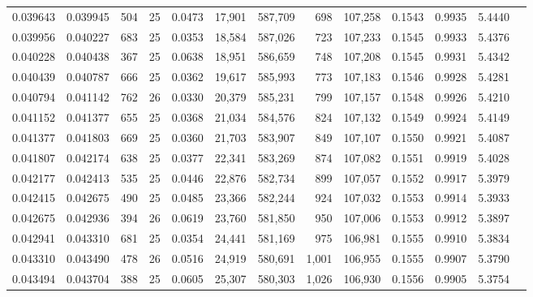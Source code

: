 \begin{tabular}{rrrrrrrrrrrrr}
0.039643 & 0.039945 & 504 &  25 &                                     0.0473 &  17,901 & 587,709 &     698 & 107,258 & 0.1543 & 0.9935 & 5.4440 \\
0.039956 & 0.040227 & 683 &  25 &                                     0.0353 &  18,584 & 587,026 &     723 & 107,233 & 0.1545 & 0.9933 & 5.4376 \\
0.040228 & 0.040438 & 367 &  25 &                                     0.0638 &  18,951 & 586,659 &     748 & 107,208 & 0.1545 & 0.9931 & 5.4342 \\
0.040439 & 0.040787 & 666 &  25 &                                     0.0362 &  19,617 & 585,993 &     773 & 107,183 & 0.1546 & 0.9928 & 5.4281 \\
0.040794 & 0.041142 & 762 &  26 &                                     0.0330 &  20,379 & 585,231 &     799 & 107,157 & 0.1548 & 0.9926 & 5.4210 \\
0.041152 & 0.041377 & 655 &  25 &                                     0.0368 &  21,034 & 584,576 &     824 & 107,132 & 0.1549 & 0.9924 & 5.4149 \\
0.041377 & 0.041803 & 669 &  25 &                                     0.0360 &  21,703 & 583,907 &     849 & 107,107 & 0.1550 & 0.9921 & 5.4087 \\
0.041807 & 0.042174 & 638 &  25 &                                     0.0377 &  22,341 & 583,269 &     874 & 107,082 & 0.1551 & 0.9919 & 5.4028 \\
0.042177 & 0.042413 & 535 &  25 &                                     0.0446 &  22,876 & 582,734 &     899 & 107,057 & 0.1552 & 0.9917 & 5.3979 \\
0.042415 & 0.042675 & 490 &  25 &                                     0.0485 &  23,366 & 582,244 &     924 & 107,032 & 0.1553 & 0.9914 & 5.3933 \\
0.042675 & 0.042936 & 394 &  26 &                                     0.0619 &  23,760 & 581,850 &     950 & 107,006 & 0.1553 & 0.9912 & 5.3897 \\
0.042941 & 0.043310 & 681 &  25 &                                     0.0354 &  24,441 & 581,169 &     975 & 106,981 & 0.1555 & 0.9910 & 5.3834 \\
0.043310 & 0.043490 & 478 &  26 &                                     0.0516 &  24,919 & 580,691 &   1,001 & 106,955 & 0.1555 & 0.9907 & 5.3790 \\
0.043494 & 0.043704 & 388 &  25 &                                     0.0605 &  25,307 & 580,303 &   1,026 & 106,930 & 0.1556 & 0.9905 & 5.3754 \\

\end{tabular}
